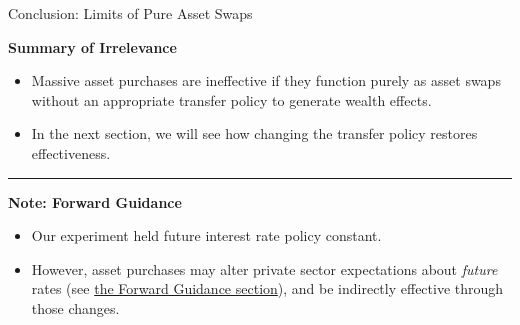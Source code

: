 \documentclass[11pt,aspectratio=169]{beamer}
\begin{document}
\begin{frame}{Conclusion: Limits of Pure Asset Swaps}
\small

\textbf{Summary of Irrelevance}
\begin{itemize}
    \item Massive asset purchases are ineffective if they function purely as asset swaps without an appropriate transfer policy to generate wealth effects.
    \item In the next section, we will see how changing the transfer policy restores effectiveness.
\end{itemize}

\vspace{0.4cm}

\hrule
\vspace{0.2cm}

\textbf{Note: Forward Guidance}
\begin{itemize}
    \item Our experiment held future interest rate policy constant.
    \item However, asset purchases may alter private sector expectations about \textit{future} rates (see \hyperref[ChapterFWG]{the Forward Guidance section}), and be indirectly effective through those changes.
\end{itemize}
\end{frame}
\end{document}
